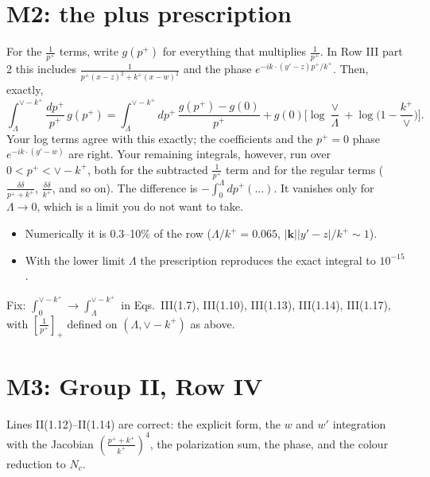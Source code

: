 \documentclass[10pt]{article}
\numberwithin{equation}{section}
\begin{document}
\section{M2: the plus prescription}\label{sec:M2}
For the $\frac{1}{p^+}$ terms, write $g(p^+)$ for everything that multiplies $\frac1{p^+}$. In Row III part 2 this includes $\frac{1}{p^+(x-z)^2+k^+(x-w)^2}$ and the phase $e^{-ik\cdot(y'-z)p^+/k^+}$. Then, exactly,
\begin{equation}
\int_\Lambda^{\vee-k^+}\frac{dp^+}{p^+}\,g(p^+)=\int_\Lambda^{\vee-k^+}dp^+\,\frac{g(p^+)-g(0)}{p^+}+g(0)\Big[\log\frac{\vee}{\Lambda}+\log\Big(1-\frac{k^+}{\vee}\Big)\Big].
\end{equation}
Your log terms agree with this exactly; the coefficients and the $p^+=0$ phase $e^{-ik\cdot(y'-w)}$ are right. Your remaining integrals, however, run over $0<p^+<\vee-k^+$, both for the subtracted $\frac{1}{p^+}$ term and for the regular terms ($\frac{\delta\delta}{p^++k^+}$, $\frac{\delta\delta}{k^+}$, and so on). The difference is $-\int_0^\Lambda dp^+(\dots)$. It vanishes only for $\Lambda\to0$, which is a limit you do not want to take.
\begin{itemize}
\item Numerically it is 0.3--10\% of the row ($\Lambda/k^+=0.065$, $|\mathbf k||y'-z|/k^+\sim1$).
\item With the lower limit $\Lambda$ the prescription reproduces the exact integral to $10^{-15}$.
\end{itemize}
Fix: $\int_0^{\vee-k^+}\to\int_\Lambda^{\vee-k^+}$ in Eqs.\ III(1.7), III(1.10), III(1.13), III(1.14), III(1.17), with $[\frac1{p^+}]_+$ defined on $(\Lambda,\vee-k^+)$ as above.

\section{M3: Group II, Row IV}\label{sec:M3}
Lines II(1.12)--II(1.14) are correct: the explicit form, the $w$ and $w'$ integration with the Jacobian $(\frac{p^++k^+}{k^+})^4$, the polarization sum, the phase, and the colour reduction to $N_c$.
\end{document}
